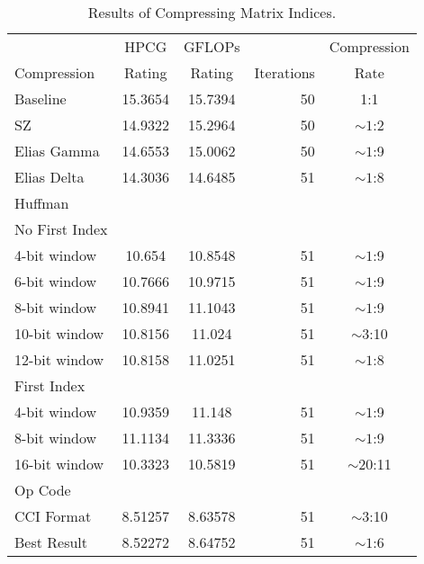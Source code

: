 \begin{table}
	\centering
	\begin{tabular}{l|S[table-format=2.6]|S[table-format=2.6]|r|c}
		            & {HPCG}   & {GFLOPs} &            & Compression \\
		Compression & {Rating} & {Rating} & Iterations & Rate \\
		\hline
		Baseline & 15.3654 & 15.7394 & 50 & 1:1 \\ %
		SZ & 14.9322 & 15.2964 & 50 & \({\sim}1\):2 \\
		Elias Gamma & 14.6553 & 15.0062 & 50 & \({\sim}1\):9 \\
		Elias Delta & 14.3036 & 14.6485 & 51 & \({\sim}1\):8 \\
		Huffman & & & & \\
		\hspace{3mm}No First Index & & & & \\
			\hspace{6mm}4-bit window & 10.654 & 10.8548 & 51 & \({\sim}1\):9 \\
			\hspace{6mm}6-bit window & 10.7666 & 10.9715 & 51 &  \({\sim}1\):9 \\
			\hspace{6mm}8-bit window & 10.8941 & 11.1043 & 51 & \({\sim}1\):9 \\
			\hspace{6mm}10-bit window & 10.8156 & 11.024 & 51 & \({\sim}3\):10 \\
			\hspace{6mm}12-bit window & 10.8158 & 11.0251 & 51 & \({\sim}1\):8 \\
		\hspace{3mm}First Index & & & & \\
			\hspace{6mm}4-bit window & 10.9359 & 11.148 & 51 & \({\sim}1\):9 \\
			\hspace{6mm}8-bit window & 11.1134 & 11.3336 & 51 & \({\sim}1\):9 \\
			\hspace{6mm}16-bit window & 10.3323 & 10.5819 & 51 & \({\sim}20\):11 \\
		Op Code & & & & \\
		\hspace{3mm}CCI Format~\cite{Lawlor:2013:compression} & 8.51257 & 8.63578 & 51 & \({\sim}3\):10 \\
		\hspace{3mm}Best Result & 8.52272 & 8.64752 & 51 & \({\sim}1\):6 \\
	\end{tabular}
	\caption{Results of Compressing Matrix Indices.}
	\label{tab:results-ind}
\end{table}
